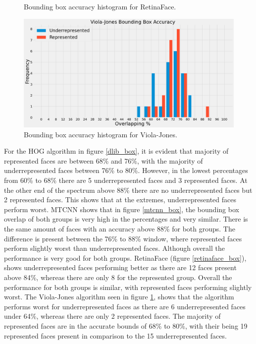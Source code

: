 \documentclass{l4proj}
\begin{document}
\begin{figure}[h!]
\begin{minipage}{0.49\textwidth}
    \caption{Bounding box accuracy histogram for RetinaFace.}
    \label{retinaface_box}
  \end{minipage}
    \hfill
  \begin{minipage}{0.49\textwidth}
    \includegraphics[width=\textwidth]{images/viola_box.png}
    \caption{Bounding box accuracy histogram for Viola-Jones.}
    \label{viola_box}
  \end{minipage} 
 
\end{figure}

For the HOG algorithm in figure \ref{dlib_box}, it is evident that majority of represented faces are between 68\% and 76\%, with the majority of underrepresented faces between 76\% to 80\%. However, in the lowest percentages from 60\% to 68\% there are 5 underrepresented faces and 3 represented faces. At the other end of the spectrum above 88\% there are no underrepresented faces but 2 represented faces. This shows that at the extremes, underrepresented faces perform worst. MTCNN shows that in figure \ref{mtcnn_box}, the bounding box overlap of both groups is very high in the percentages and very similar. There is the same amount of faces with an accuracy above 88\% for both groups. The difference is present between the 76\% to 88\% window, where represented faces perform slightly worst than underrepresented faces. Although overall the performance is very good for both groups. RetinaFace (figure \ref{retinaface_box}), shows underrepresented faces performing better as there are 12 faces present above 84\%, whereas there are only 8 for the represented group. Overall the performance for both groups is similar, with represented faces performing slightly worst. The Viola-Jones algorithm seen in figure \ref{viola_box}, shows that the algorithm performs worst for underrepresented faces as there are 6 underrepresented faces under 64\%, whereas there are only 2 represented faces. The majority of represented faces are in the accurate bounds of 68\% to 80\%, with their being 19 represented faces present in comparison to the 15 underrepresented faces.
\end{document}
